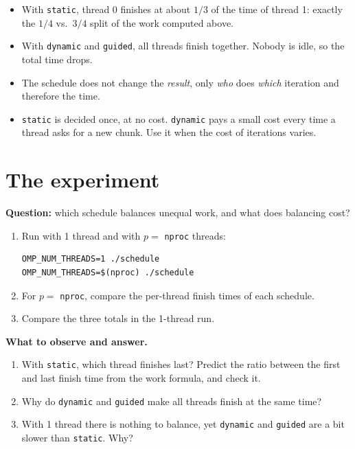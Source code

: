 \documentclass[11pt,a4paper]{article}
\begin{document}
\begin{keyidea}
\begin{itemize}
  \item With \texttt{static}, thread 0 finishes at about $1/3$ of the time of thread 1:
        exactly the $1/4$ vs.\ $3/4$ split of the work computed above.
  \item With \texttt{dynamic} and \texttt{guided}, all threads finish together. Nobody is
        idle, so the total time drops.
  \item The schedule does not change the \emph{result}, only \emph{who} does
        \emph{which} iteration and therefore the time.
  \item \texttt{static} is decided once, at no cost. \texttt{dynamic} pays a small cost
        every time a thread asks for a new chunk. Use it when the cost of iterations
        varies.
\end{itemize}
\end{keyidea}

\section{The experiment}
\begin{experiment}
\textbf{Question:} which schedule balances unequal work, and what does balancing cost?
\begin{enumerate}
  \item Run with 1 thread and with $p =$ \texttt{nproc} threads:
\begin{lstlisting}[style=sh]
OMP_NUM_THREADS=1 ./schedule
OMP_NUM_THREADS=$(nproc) ./schedule
\end{lstlisting}
  \item For $p =$ \texttt{nproc}, compare the per-thread finish times of each schedule.
  \item Compare the three totals in the 1-thread run.
\end{enumerate}
\textbf{What to observe and answer.}
\begin{enumerate}
  \item With \texttt{static}, which thread finishes last? Predict the ratio between the
        first and last finish time from the work formula, and check it.
  \item Why do \texttt{dynamic} and \texttt{guided} make all threads finish at the same time?
  \item With 1 thread there is nothing to balance, yet \texttt{dynamic} and
        \texttt{guided} are a bit slower than \texttt{static}. Why?
\end{enumerate}
\end{experiment}
\end{document}
